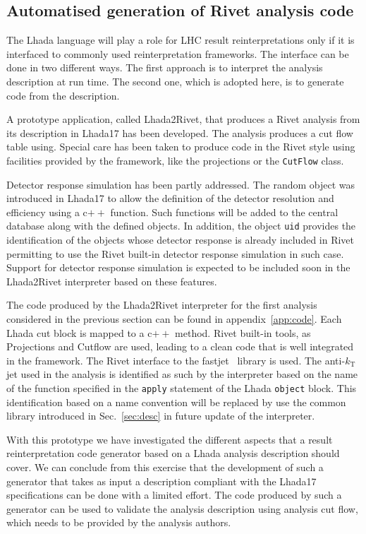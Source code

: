 \documentclass[11pt]{cernrep}
\begin{document}
\subsection{Automatised generation of Rivet analysis code}

The {\sc Lhada} language will play a role for LHC result reinterpretations only if it is interfaced to commonly used reinterpretation frameworks. The interface can be done in two different ways. The first approach is to interpret the analysis description at run time. The second one, which is adopted here, is to generate code from the description.

A prototype application, called {\sc Lhada2Rivet}, that produces a {\sc Rivet} analysis from its description in {\sc Lhada17} has been developed. The analysis produces a cut flow table using. Special care has been taken to produce code in the {\sc Rivet} style using facilities provided by the framework, like the projections or the {\tt CutFlow} class.

Detector response simulation has been partly addressed. The random object was introduced in {\sc Lhada17} to allow the definition of  the detector resolution and efficiency using a c$++$ function.  Such functions will be added to the central database along with the defined objects. In addition, the object {\tt uid} provides the identification of the objects whose detector response is already included in {\sc Rivet} permitting to use the Rivet built-in detector response simulation in such case. Support for detector response simulation is expected to be included soon in the {\sc Lhada2Rivet} interpreter based on these features.

The code produced by the {\sc Lhada2Rivet} interpreter for the first analysis considered in the previous section can be found in appendix~\ref{app:code}. Each {\sc Lhada} cut block is mapped to a c$++$ method. Rivet built-in tools, as Projections and Cutflow are used, leading to a clean code that is well integrated in the framework. The {\sc Rivet} interface to the fastjet~\cite{Cacciari:2011ma} library is used. The anti-$k_{\text{T}}$ jet used in the analysis is identified as such by the interpreter based on the name of the function specified in the {\tt apply} statement of the {\sc Lhada} {\tt object} block. This identification based on a name convention will be replaced by use the common library introduced in Sec.~\ref{sec:desc} in future update of the interpreter.

With this prototype we have investigated the different aspects that a result reinterpretation code generator based on a {\sc Lhada} analysis description should cover. We can conclude from this exercise that the development of such a generator that takes as input a description compliant with the {\sc Lhada17} specifications can be done with a limited effort. The code produced by such a generator can be used to validate the analysis description using analysis cut flow, which needs to be provided by the analysis authors. 
\end{document}
